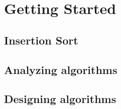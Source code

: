 \chapter{Getting Started}
\section{Insertion Sort}
\renewcommand{\thesubsection}{Exercise \thesection-\arabic{subsection}}
\subsection{}

\subsection{}

\subsection{}

\subsection{}

\section{Analyzing algorithms}
\subsection{}

\subsection{}

\subsection{}

\section{Designing algorithms}
\subsection{}

\subsection{}

\setcounter{subsection}{3}
\subsection{}

